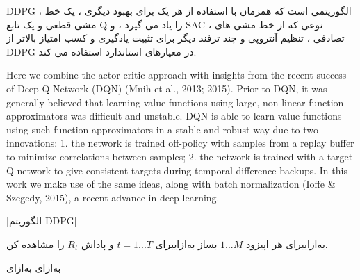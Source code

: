 DDPG
 ، الگوریتمی است که همزمان با استفاده از هر یک برای بهبود دیگری ، یک خط مشی قطعی و یک تابع Q را یاد می گیرد ،
و SAC ، نوعی که از خط مشی های تصادفی ، تنظیم آنتروپی  و چند ترفند دیگر برای تثبیت یادگیری و کسب امتیاز بالاتر از DDPG در معیارهای استاندارد استفاده می کند.


Here we combine the actor-critic approach with insights from the recent success of Deep Q Network
(DQN) (Mnih et al., 2013; 2015). Prior to DQN, it was generally believed that learning value
functions using large, non-linear function approximators was difficult and unstable. DQN is able
to learn value functions using such function approximators in a stable and robust way due to two
innovations: 1. the network is trained off-policy with samples from a replay buffer to minimize
correlations between samples; 2. the network is trained with a target Q network to give consistent
targets during temporal difference backups. In this work we make use of the same ideas, along with
batch normalization (Ioffe & Szegedy, 2015), a recent advance in deep learning.

[الگوریتم DDPG]

\‌به‌ازای{برای هر اپیزود $1...M$}
 بساز
\‌به‌ازای{برای $t=1...T$}
 و پاداش $R_t$ را مشاهده کن.
    
‌به‌ازای
‌به‌ازای

